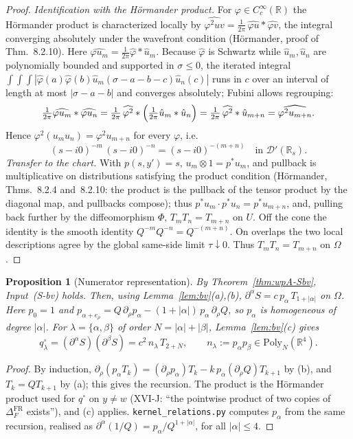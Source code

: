 \documentclass{article}
\newtheorem{proposition}{Proposition}
\theoremstyle{remark}
\begin{document}
\begin{proof}
\emph{Identification with the H\"ormander product.} For $\varphi\in C^\infty_c(\mathbb R)$ the H\"ormander product is characterized locally by $\widehat{\varphi^2uv}=\frac1{2\pi}\,\widehat{\varphi u}*\widehat{\varphi v}$, the integral converging absolutely under the wavefront condition (H\"ormander, proof of Thm.~8.2.10).
Here $\widehat{\varphi u_m}=\frac1{2\pi}\hat\varphi*\hat u_m$.
Because $\hat\varphi$ is Schwartz while $\hat u_m,\hat u_n$ are polynomially bounded and supported in $\sigma\le0$, the iterated integral $\int\!\!\int\!\!\int|\hat\varphi(a)\hat\varphi(b)\hat u_m(\sigma-a-b-c)\hat u_n(c)|$ runs in $c$ over an interval of length at most $|\sigma-a-b|$ and converges absolutely; Fubini allows regrouping:
\[
\tfrac1{2\pi}\widehat{\varphi u_m}*\widehat{\varphi u_n}
=\tfrac1{2\pi}\,\widehat{\varphi^2}*\Bigl(\tfrac1{2\pi}\hat u_m*\hat u_n\Bigr)
=\tfrac1{2\pi}\,\widehat{\varphi^2}*\hat u_{m+n}
=\widehat{\varphi^2u_{m+n}} .
\]
Hence $\varphi^2(u_mu_n)=\varphi^2u_{m+n}$ for every $\varphi$, i.e.
\[
(s-i0)^{-m}\,(s-i0)^{-n}=(s-i0)^{-(m+n)}
\quad\text{in }\mathcal D'(\mathbb R_s).
\]
\emph{Transfer to the chart.} With $p(s,y')=s$, $u_m\otimes1=p^*u_m$, and pullback is multiplicative on distributions satisfying the product condition (H\"ormander, Thms.~8.2.4 and~8.2.10: the product is the pullback of the tensor product by the diagonal map, and pullbacks compose); thus $p^*u_m\cdot p^*u_n=p^*u_{m+n}$, and, pulling back further by the diffeomorphism $\Phi$, $T_mT_n=T_{m+n}$ on $U$.
Off the cone the identity is the smooth identity $Q^{-m}Q^{-n}=Q^{-(m+n)}$.
On overlaps the two local descriptions agree by the global same-side limit $\tau\downarrow0$.
Thus $T_mT_n=T_{m+n}$ on $\Omega$.
\end{proof}

\begin{proposition}[Numerator representation]
\label{prop:num}
By Theorem~\ref{thm:wpA-Sbv}, Input~(S-bv) holds.
Then, using Lemma~\ref{lem:bv}(a),(b), $\partial^\alpha S=c\,p_\alpha\,T_{1+|\alpha|}$ on $\Omega$.
Here $p_0=1$ and $p_{\alpha+e_\rho}=Q\,\partial_\rho p_\alpha-(1+|\alpha|)\,p_\alpha\,\partial_\rho Q$, so $p_\alpha$ is homogeneous of degree $|\alpha|$.
For $\lambda=\{\alpha,\beta\}$ of order $N=|\alpha|+|\beta|$, Lemma~\ref{lem:bv}(c) gives
\[
q^\circ_\lambda=(\partial^\alpha S)(\partial^\beta S)=c^2\,n_\lambda\,T_{2+N},\qquad n_\lambda:=p_\alpha p_\beta\in\mathrm{Poly}_N(\mathbb R^4).
\]
\end{proposition}

\begin{proof}
By induction, $\partial_\rho(p_\alpha T_k)=(\partial_\rho p_\alpha)T_k-k\,p_\alpha(\partial_\rho Q)T_{k+1}$ by (b), and $T_k=QT_{k+1}$ by (a); this gives the recursion.
The product is the H\"ormander product used for $q^\circ$ on $y\neq w$ (XVI-J: ``the pointwise product of two copies of \(\Delta_F^{\mathrm{FR}}\) exists''), and (c) applies.
\texttt{kernel\_relations.py} computes $p_\alpha$ from the same recursion, realised as $\partial^\alpha(1/Q)=p_\alpha/Q^{1+|\alpha|}$, for all $|\alpha|\le4$.
\end{proof}
\end{document}
